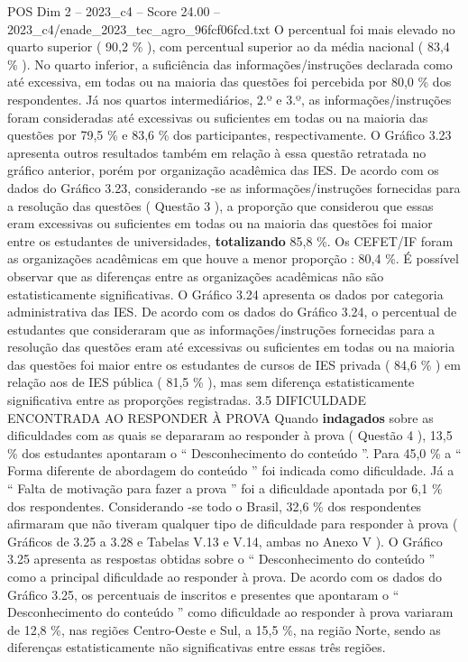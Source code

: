 \begin{textsample}{POS Dim 2 – 2023\_c4 – Score 24.00 – 2023\_c4/enade\_2023\_tec\_agro\_96fcf06fcd.txt}
O percentual foi mais elevado no quarto superior ( 90,2 \% ), com percentual superior ao da média nacional ( 83,4 \% ).
No quarto inferior, a suficiência das informações/instruções declarada como até excessiva, em todas ou na maioria das questões foi percebida por 80,0 \% dos respondentes.
Já nos quartos intermediários, 2.º e 3.º, as informações/instruções foram consideradas até excessivas ou suficientes em todas ou na maioria das questões por 79,5 \% e 83,6 \% dos participantes, respectivamente.
O Gráfico 3.23 apresenta outros resultados também em relação à essa questão retratada no gráfico anterior, porém por organização acadêmica das IES.
De acordo com os dados do Gráfico 3.23, considerando -se as informações/instruções fornecidas para a resolução das questões ( Questão 3 ), a proporção que considerou que essas eram excessivas ou suficientes em todas ou na maioria das questões foi maior entre os estudantes de universidades, \textbf{totalizando} 85,8 \%.
Os CEFET/IF foram as organizações acadêmicas em que houve a menor proporção : 80,4 \%.
É possível observar que as diferenças entre as organizações acadêmicas não são estatisticamente significativas.
O Gráfico 3.24 apresenta os dados por categoria administrativa das IES.
De acordo com os dados do Gráfico 3.24, o percentual de estudantes que consideraram que as informações/instruções fornecidas para a resolução das questões eram até excessivas ou suficientes em todas ou na maioria das questões foi maior entre os estudantes de cursos de IES privada ( 84,6 \% ) em relação aos de IES pública ( 81,5 \% ), mas sem diferença estatisticamente significativa entre as proporções registradas. 3.5 DIFICULDADE ENCONTRADA AO RESPONDER À PROVA Quando \textbf{indagados} sobre as dificuldades com as quais se depararam ao responder à prova ( Questão 4 ), 13,5 \% dos estudantes apontaram o “ Desconhecimento do conteúdo ”.
Para 45,0 \% a “ Forma diferente de abordagem do conteúdo ” foi indicada como dificuldade.
Já a “ Falta de motivação para fazer a prova ” foi a dificuldade apontada por 6,1 \% dos respondentes.
Considerando -se todo o Brasil, 32,6 \% dos respondentes afirmaram que não tiveram qualquer tipo de dificuldade para responder à prova ( Gráficos de 3.25 a 3.28 e Tabelas V.13 e V.14, ambas no Anexo V ).
O Gráfico 3.25 apresenta as respostas obtidas sobre o “ Desconhecimento do conteúdo ” como a principal dificuldade ao responder à prova.
De acordo com os dados do Gráfico 3.25, os percentuais de inscritos e presentes que apontaram o “ Desconhecimento do conteúdo ” como dificuldade ao responder à prova variaram de 12,8 \%, nas regiões Centro-Oeste e Sul, a 15,5 \%, na região Norte, sendo as diferenças estatisticamente não significativas entre essas três regiões.

\end{textsample}
